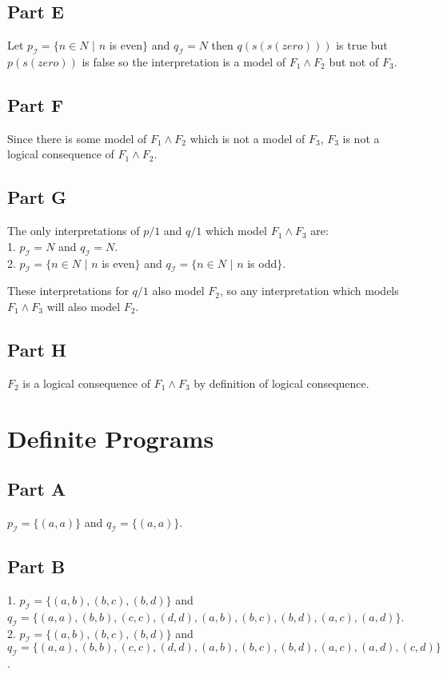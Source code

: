 \documentclass[11pt, oneside]{article}   	%
\begin{document}
\subsection{Part E}
Let $p_\mathscr{I} = \{n \in N$ $|$ $n$ is even$\}$ and $q_\mathscr{I} = N$ then $q(s(s(zero)))$ is true but $p(s(zero))$ is false so the interpretation is a model of $F_1 \land F_2$ but not of $F_3$.

\subsection{Part F}
Since there is some model of $F_1 \land F_2$ which is not a model of $F_3$, $F_3$ is not a logical consequence of $F_1 \land F_2$.

\subsection{Part G}
The only interpretations of $p/1$ and $q/1$ which model $F_1 \land F_3$ are:\\
1. $p_\mathscr{I} = N$ and $q_\mathscr{I} = N$.\\
2. $p_\mathscr{I} = \{n \in N$ $|$ $n$ is even$\}$ and $q_\mathscr{I} = \{n \in N$ $|$ $n$ is odd$\}$.

These interpretations for $q/1$ also model $F_2$, so any interpretation which models $F_1 \land F_3$ will also model $F_2$.

\subsection{Part H}
$F_2$ is a logical consequence of $F_1 \land F_3$ by definition of logical consequence.

\section{Definite Programs}
\subsection{Part A}
$p_\mathscr{I} = \{(a, a)\}$ and $q_\mathscr{I} = \{(a, a)\}$.

\subsection{Part B}
1. $p_\mathscr{I} = \{(a, b), (b, c), (b, d)\}$ and $q_\mathscr{I} = \{(a, a), (b, b), (c, c), (d, d), (a, b), (b, c), (b, d), (a, c), (a, d)\}$.\\
2. $p_\mathscr{I} = \{(a, b), (b, c), (b, d)\}$ and $q_\mathscr{I} = \{(a, a), (b, b), (c, c), (d, d), (a, b), (b, c), (b, d), (a, c), (a, d), (c, d)\}$.
\end{document}
